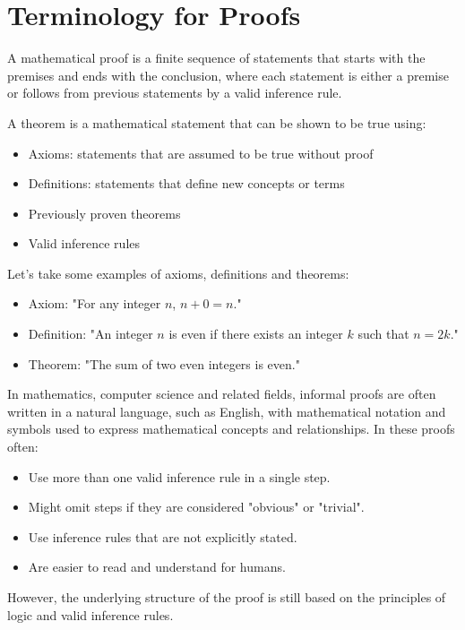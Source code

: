 \section{Terminology for Proofs}
\begin{definition}
    A mathematical proof is a finite sequence of statements that starts with the premises and ends with the conclusion, where each statement is either a premise or follows from previous statements by a valid inference rule.
\end{definition}

\begin{definition}[Theorem]
    A theorem is a mathematical statement that can be shown to be true using:
    \begin{itemize}[itemsep=1pt,label=$\circ$]
        \item Axioms: statements that are assumed to be true without proof
        \item Definitions: statements that define new concepts or terms
        \item Previously proven theorems
        \item Valid inference rules
    \end{itemize}
\end{definition}

\begin{eg}
    Let's take some examples of axioms, definitions and theorems:
    \begin{itemize}[itemsep=1pt,label=$\circ$]
        \item Axiom: "For any integer $n$, $n + 0 = n$."
        \item Definition: "An integer $n$ is even if there exists an integer $k$ such that $n = 2k$."
        \item Theorem: "The sum of two even integers is even."
    \end{itemize}
\end{eg}
In mathematics, computer science and related fields, informal proofs are often written in a natural language, such as English, with mathematical notation and symbols used to express mathematical concepts and relationships. In these proofs often:
\begin{itemize}[itemsep=1pt,label=$\circ$]
    \item Use more than one valid inference rule in a single step.
    \item Might omit steps if they are considered "obvious" or "trivial".
    \item Use inference rules that are not explicitly stated.
    \item Are easier to read and understand for humans.
\end{itemize}
However, the underlying structure of the proof is still based on the principles of logic and valid inference rules.

